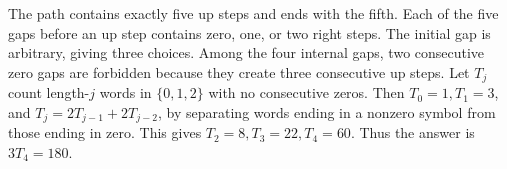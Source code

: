 The path contains exactly five up steps and ends with the fifth. Each of the five gaps before an up step contains zero, one, or two right steps. The initial gap is arbitrary, giving three choices. Among the four internal gaps, two consecutive zero gaps are forbidden because they create three consecutive up steps. Let $T_j$ count length-$j$ words in $\{0,1,2\}$ with no consecutive zeros. Then $T_0=1,T_1=3$, and $T_j=2T_{j-1}+2T_{j-2}$, by separating words ending in a nonzero symbol from those ending in zero. This gives $T_2=8,T_3=22,T_4=60$. Thus the answer is $3T_4=\boxed{180}$.

